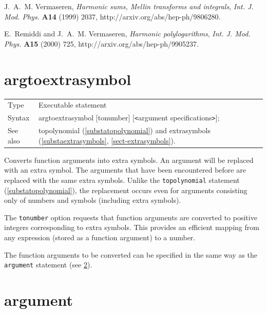 J.~A.~M. Vermaseren, {\it Harmonic sums, Mellin transforms and integrals},
  {\em Int. J. Mod. Phys.} {\bf A14} (1999) 2037,
  http://arxiv.org/abs/hep-ph/9806280.

E.~Remiddi and J.~A.~M. Vermaseren, {\it Harmonic polylogarithms},  {\em 
Int. J. Mod. Phys.} {\bf A15} (2000) 725,
  http://arxiv.org/abs/hep-ph/9905237.
\vspace{10mm}


\section{argtoextrasymbol}
\label{substaargtoextrasymbol}

\noindent
\begin{tabular}{ll}
Type &
  Executable statement \\
Syntax &
  argtoextrasymbol [tonumber] [{\tt<}argument specifications{\tt>}]; \\
See also &
  topolynomial (\ref{substatopolynomial}) and
  extrasymbols (\ref{substaextrasymbols}, \ref{sect-extrasymbols}).
\end{tabular}
\vspace{4mm}

\noindent
Converts function arguments into extra symbols. 
An argument will be replaced with an extra symbol. 
The arguments that have been encountered before are replaced with the same 
extra symbols. 
Unlike the \texttt{topolynomial} statement (\ref{substatopolynomial}), the 
replacement occurs even for arguments consisting only of numbers and symbols 
(including extra symbols). 
\vspace{4mm}

\noindent
The \texttt{tonumber} option requests that function arguments are converted to 
positive integers corresponding to extra symbols. This provides an efficient 
mapping from any expression (stored as a function argument) to a number. 
\vspace{4mm}

\noindent
The function arguments to be converted can be specified in the same way as the 
\texttt{argument} statement (see \ref{substaargument}). 
\vspace{10mm}


\section{argument}
\label{substaargument}

